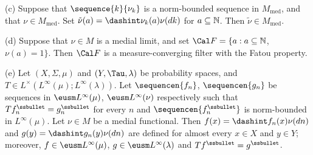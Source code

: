 (c) Suppose that $\sequence{k}{\nu_k}$ is a norm-bounded sequence in
$M_{\text{med}}$, and that $\nu\in M_{\text{med}}$.   Set
$\tilde\nu(a)=\dashint\nu_k(a)\nu(dk)$ for $a\subseteq\Bbb N$.   Then
$\tilde\nu\in M_{\text{med}}$.

(d) Suppose that $\nu\in M$ is a medial limit, and set
$\Cal F=\{a:a\subseteq\Bbb N$, $\nu(a)=1\}$.   Then $\Cal F$ is a
measure-converging filter with the Fatou property.

(e) Let $(X,\Sigma,\mu)$ and $(Y,\Tau,\lambda)$ be probability spaces, and
$T\in L^{\times}(L^{\infty}(\mu);L^{\infty}(\lambda))$.
Let $\sequencen{f_n}$, $\sequencen{g_n}$ be sequences in
$\eusm L^{\infty}(\mu)$, $\eusm L^{\infty}(\nu)$ respectively such that
$Tf_n^{\ssbullet}=g_n^{\ssbullet}$ for every $n$ and
$\sequencen{f_n^{\ssbullet}}$ is norm-bounded in $L^{\infty}(\mu)$.
Let $\nu\in M$ be a medial functional.   Then
$f(x)=\dashint f_n(x)\nu(dn)$ and
$g(y)=\dashint g_n(y)\nu(dn)$ are defined for almost every $x\in X$ and
$y\in Y$;  moreover,
$f\in\eusm L^{\infty}(\mu)$, $g\in\eusm L^{\infty}(\lambda)$ and
$Tf^{\ssbullet}=g^{\ssbullet}$.


